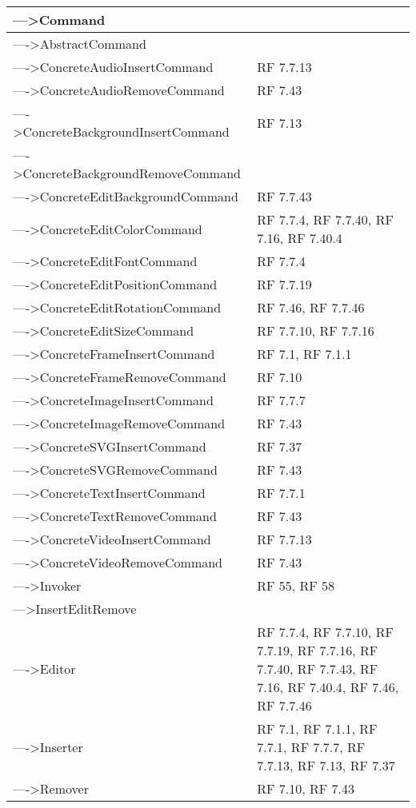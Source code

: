 {\begin{longtable} [c]{| p{8cm} | p{6cm} |}
 \hline 
--->Command & \\ 
 \hline 
---->AbstractCommand & \\ 
 \hline 
---->ConcreteAudioInsertCommand & RF 7.7.13\\ 
 \hline 
---->ConcreteAudioRemoveCommand & RF 7.43\\ 
 \hline 
---->ConcreteBackgroundInsertCommand & RF 7.13\\ 
 \hline 
---->ConcreteBackgroundRemoveCommand & \\ 
 \hline 
---->ConcreteEditBackgroundCommand & RF 7.7.43\\ 
 \hline 
---->ConcreteEditColorCommand & RF 7.7.4, RF 7.7.40, RF 7.16, RF 7.40.4\\ 
 \hline 
---->ConcreteEditFontCommand & RF 7.7.4\\ 
 \hline 
---->ConcreteEditPositionCommand & RF 7.7.19\\ 
 \hline 
---->ConcreteEditRotationCommand & RF 7.46, RF 7.7.46\\ 
 \hline 
---->ConcreteEditSizeCommand & RF 7.7.10, RF 7.7.16\\ 
 \hline 
---->ConcreteFrameInsertCommand & RF 7.1, RF 7.1.1\\ 
 \hline 
---->ConcreteFrameRemoveCommand & RF 7.10\\ 
 \hline 
---->ConcreteImageInsertCommand & RF 7.7.7\\ 
 \hline 
---->ConcreteImageRemoveCommand & RF 7.43\\ 
 \hline 
---->ConcreteSVGInsertCommand & RF 7.37\\ 
 \hline 
---->ConcreteSVGRemoveCommand & RF 7.43\\ 
 \hline 
---->ConcreteTextInsertCommand & RF 7.7.1\\ 
 \hline 
---->ConcreteTextRemoveCommand & RF 7.43\\ 
 \hline 
---->ConcreteVideoInsertCommand & RF 7.7.13\\ 
 \hline 
---->ConcreteVideoRemoveCommand & RF 7.43\\ 
 \hline 
---->Invoker & RF 55, RF 58\\ 
 \hline 
--->InsertEditRemove & \\ 
 \hline 
---->Editor & RF 7.7.4, RF 7.7.10, RF 7.7.19, RF 7.7.16, RF 7.7.40, RF 7.7.43, RF 7.16, RF 7.40.4, RF 7.46, RF 7.7.46\\ 
 \hline 
---->Inserter & RF 7.1, RF 7.1.1, RF 7.7.1, RF 7.7.7, RF 7.7.13, RF 7.13, RF 7.37\\ 
 \hline 
---->Remover & RF 7.10, RF 7.43\\ 

\end{longtable}}
